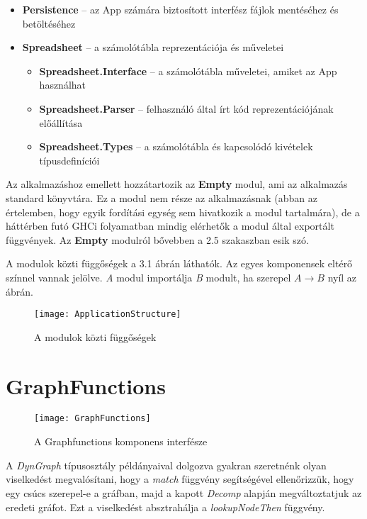 \begin{itemize}
	\item \textbf{Persistence} -- az App számára biztosított interfész fájlok mentéséhez és betöltéséhez
	\item \textbf{Spreadsheet} -- a számolótábla reprezentációja és műveletei
	\begin{itemize}
		\item \textbf{Spreadsheet.Interface} -- a számolótábla műveletei, amiket az App használhat
		\item \textbf{Spreadsheet.Parser} -- felhasználó által írt kód reprezentációjának előállítása
		\item \textbf{Spreadsheet.Types} -- a számolótábla és kapcsolódó kivételek típusdefiníciói
	\end{itemize}
\end{itemize} 

Az alkalmazáshoz emellett hozzátartozik az \textbf{Empty} modul, ami az alkalmazás standard könyvtára. Ez a modul nem része az alkalmazásnak (abban az értelemben, hogy egyik fordítási egység sem hivatkozik a modul tartalmára), de a háttérben futó GHCi folyamatban mindig elérhetők a modul által exportált függvények. Az \textbf{Empty} modulról bővebben a 2.5 szakaszban esik szó.

A modulok közti függőségek a 3.1 ábrán láthatók. Az egyes komponensek eltérő színnel vannak jelölve. \textit{A} modul importálja \textit{B} modult, ha szerepel $A \rightarrow B$ nyíl az ábrán. 

\begin{figure}[H]
	\centering
	\texttt{[image: ApplicationStructure]}
	\caption{A modulok közti függőségek}
	\label{fig:appstructure}
\end{figure}

\section{GraphFunctions}

\begin{figure}[H]
	\centering
	\texttt{[image: GraphFunctions]}
	\caption{A Graphfunctions komponens interfésze}
	\label{fig:appstructure}
\end{figure}

A \textit{DynGraph} típusosztály példányaival dolgozva gyakran szeretnénk olyan viselkedést megvalósítani, hogy a \textit{match} függvény segítségével ellenőrizzük, hogy egy csúcs szerepel-e a gráfban, majd a kapott \textit{Decomp} alapján megváltoztatjuk az eredeti gráfot. Ezt a viselkedést absztrahálja a \textit{lookupNodeThen} függvény. 

